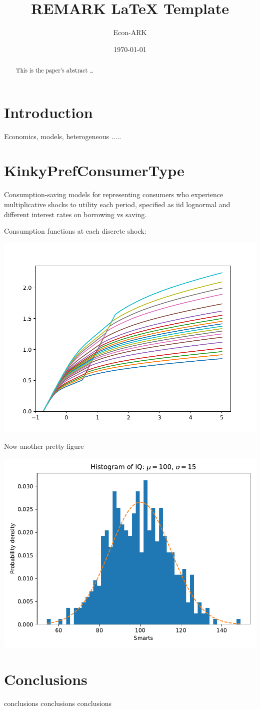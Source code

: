 \documentclass[12pt]{article}
\title{REMARK \LaTeX{} Template}
\author{
        Econ-ARK
}
\date{\today}
\begin{document}
\maketitle

\begin{abstract}
This is the paper's abstract \ldots
\end{abstract}

\section{Introduction}

Economics, models, heterogeneous .....


\section{KinkyPrefConsumerType}

Consumption-saving models for representing consumers who experience multiplicative shocks to utility each period, specified as iid lognormal and different interest rates on borrowing vs saving.

Consumption functions at each discrete shock:

\includegraphics[scale=0.8]{cFunc}


Now another pretty figure

\includegraphics[scale=0.8]{dist}



\section{Conclusions}\label{conclusions}

conclusions
conclusions
conclusions
\end{document}
